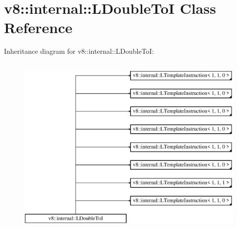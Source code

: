 \hypertarget{classv8_1_1internal_1_1_l_double_to_i}{}\section{v8\+:\+:internal\+:\+:L\+Double\+ToI Class Reference}
\label{classv8_1_1internal_1_1_l_double_to_i}
Inheritance diagram for v8\+:\+:internal\+:\+:L\+Double\+ToI\+:\begin{figure}[H]
\begin{center}
\leavevmode
\includegraphics[height=9.000000cm]{classv8_1_1internal_1_1_l_double_to_i}
\end{center}
\end{figure}
